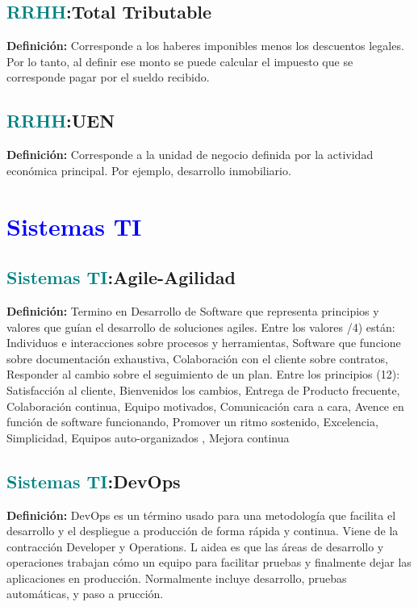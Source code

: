 \documentclass[12pt]{article}
\begin{document}
\subsection{\textcolor{teal}{RRHH}:{Total Tributable}}
\textbf{Definición:} Corresponde a los haberes imponibles menos los descuentos legales. Por lo tanto, al definir ese monto se puede calcular el impuesto que se corresponde pagar por el sueldo recibido.
\subsection{\textcolor{teal}{RRHH}:{UEN}}
\textbf{Definición:} Corresponde a la unidad de negocio definida por la actividad económica principal. Por ejemplo, desarrollo inmobiliario.
\section{\textcolor{blue}{Sistemas TI}}
\subsection{\textcolor{teal}{Sistemas TI}:{Agile-Agilidad}}
\textbf{Definición:} Termino en Desarrollo de Software que representa principios y valores que guían el desarrollo de soluciones agiles. Entre los valores /4) están: Individuos e interacciones sobre procesos y herramientas, Software que funcione sobre documentación exhaustiva, Colaboración con el cliente sobre contratos, Responder al cambio sobre el seguimiento de un plan. Entre los principios (12): Satisfacción al cliente, Bienvenidos los cambios, Entrega de Producto frecuente, Colaboración continua, Equipo motivados, Comunicación cara a cara, Avence en función de software funcionando, Promover un ritmo sostenido, Excelencia, Simplicidad, Equipos auto-organizados , Mejora continua
\subsection{\textcolor{teal}{Sistemas TI}:{DevOps}}
\textbf{Definición:} DevOps es un término usado para una metodología que  facilita el desarrollo y el despliegue a producción de forma rápida y continua. Viene de la contracción Developer y Operations. L aidea es que las áreas de desarrollo y operaciones trabajan cómo un equipo para facilitar pruebas y finalmente dejar las aplicaciones en producción. Normalmente incluye desarrollo, pruebas automáticas, y paso a prucción.
\end{document}
